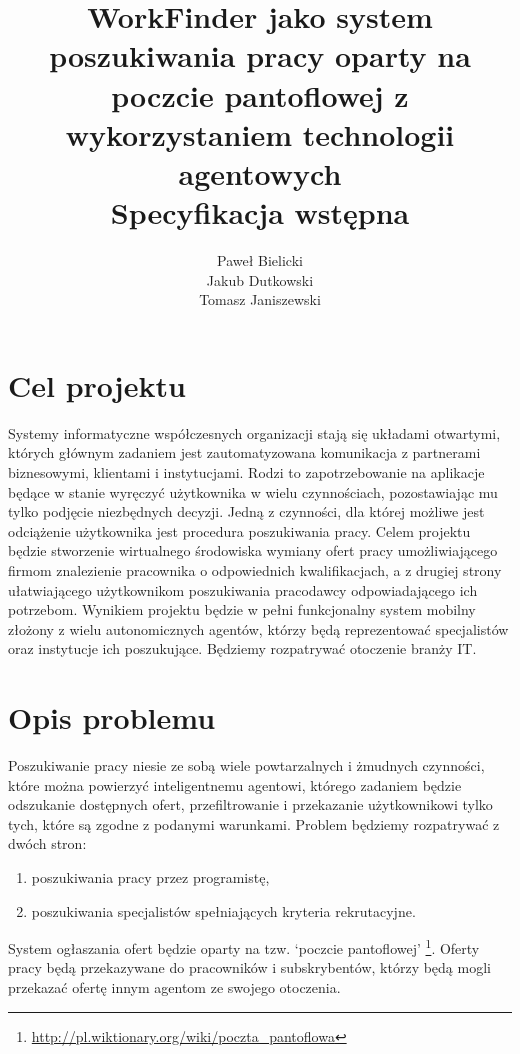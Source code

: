 \documentclass[11pt,a4paper]{article}
\author{
	Paweł Bielicki\\
	Jakub Dutkowski\\
	Tomasz Janiszewski
}
\title{
	\huge{WorkFinder jako system poszukiwania pracy oparty na poczcie pantoflowej z wykorzystaniem technologii agentowych}\\
	\LARGE{Specyfikacja wstępna}
 }
\begin{document}
\maketitle

\listoftodos
\newpage

\section{Cel projektu}
Systemy informatyczne współczesnych organizacji stają się układami otwartymi, których głównym zadaniem jest zautomatyzowana komunikacja z partnerami biznesowymi, klientami i instytucjami. Rodzi to zapotrzebowanie na aplikacje będące w stanie wyręczyć użytkownika w wielu czynnościach, pozostawiając mu tylko podjęcie niezbędnych decyzji.
\linebreak
Jedną z czynności, dla której możliwe jest odciążenie użytkownika jest procedura poszukiwania pracy. Celem projektu będzie stworzenie wirtualnego środowiska wymiany ofert pracy umożliwiającego firmom znalezienie pracownika o odpowiednich kwalifikacjach, a z drugiej strony ułatwiającego użytkownikom poszukiwania pracodawcy odpowiadającego ich potrzebom.
\linebreak
Wynikiem projektu będzie w pełni funkcjonalny system mobilny złożony z wielu autonomicznych agentów, którzy będą reprezentować specjalistów oraz instytucje ich poszukujące. Będziemy rozpatrywać otoczenie branży IT.

\section{Opis problemu}

Poszukiwanie pracy niesie ze sobą wiele powtarzalnych i żmudnych czynności, które można powierzyć inteligentnemu agentowi, którego zadaniem będzie odszukanie dostępnych ofert, przefiltrowanie i przekazanie użytkownikowi tylko tych, które są zgodne z podanymi warunkami.
\linebreak
Problem będziemy rozpatrywać z dwóch stron:
\begin{enumerate}
	\item poszukiwania pracy przez programistę,
	\item poszukiwania specjalistów spełniających kryteria rekrutacyjne.
\end{enumerate}

System ogłaszania ofert będzie oparty na tzw. `poczcie pantoflowej' \footnote{\url{http://pl.wiktionary.org/wiki/poczta_pantoflowa}}. Oferty pracy będą przekazywane do pracowników i subskrybentów, którzy będą mogli przekazać ofertę innym agentom ze swojego otoczenia.
\end{document}
